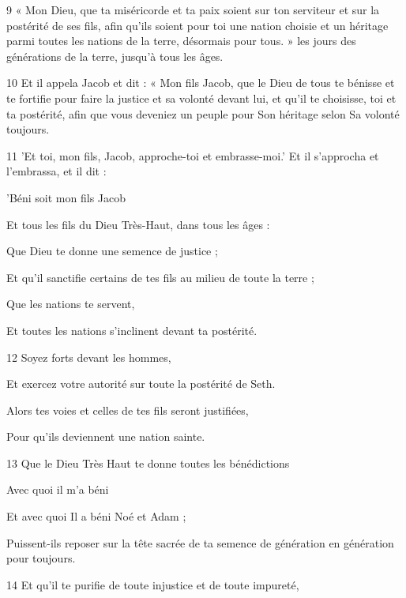 \par 9 « Mon Dieu, que ta miséricorde et ta paix soient sur ton serviteur et sur la postérité de ses fils, afin qu'ils soient pour toi une nation choisie et un héritage parmi toutes les nations de la terre, désormais pour tous. » les jours des générations de la terre, jusqu'à tous les âges.
\par 10 Et il appela Jacob et dit : « Mon fils Jacob, que le Dieu de tous te bénisse et te fortifie pour faire la justice et sa volonté devant lui, et qu'il te choisisse, toi et ta postérité, afin que vous deveniez un peuple pour Son héritage selon Sa volonté toujours.
\par 11 'Et toi, mon fils, Jacob, approche-toi et embrasse-moi.' Et il s'approcha et l'embrassa, et il dit :
\par    
\par     'Béni soit mon fils Jacob  
\par     Et tous les fils du Dieu Très-Haut, dans tous les âges :
\par    
\par     Que Dieu te donne une semence de justice ;  
\par     Et qu'il sanctifie certains de tes fils au milieu de toute la terre ;
\par    
\par     Que les nations te servent,  
\par     Et toutes les nations s'inclinent devant ta postérité.
\par    
\par 12 Soyez forts devant les hommes,  
\par     Et exercez votre autorité sur toute la postérité de Seth.
\par    
\par     Alors tes voies et celles de tes fils seront justifiées,  
\par     Pour qu'ils deviennent une nation sainte.
\par    
\par 13 Que le Dieu Très Haut te donne toutes les bénédictions  
\par     Avec quoi il m'a béni
\par    
\par     Et avec quoi Il a béni Noé et Adam ;  
\par     Puissent-ils reposer sur la tête sacrée de ta semence de génération en génération pour toujours.
\par    
\par 14 Et qu'il te purifie de toute injustice et de toute impureté,  

